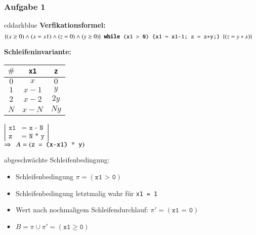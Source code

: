 \documentclass[aspectratio=1610,onlymath, ngerman, handout]{beamer}
\renewcommand{\emph}[1]{\textbf{#1}}
\newcommand*\head{\rowfont{\bfseries}}
\begin{document}
	\begin{frame} \frametitle{Aufgabe 1}
	\small
		\begin{doodle}{cddarkblue}
			\emph{Verfikationsformel:} \footnotesize
			\begin{equation*}
			\{ (x \ge 0) \land (x = x1) \land (z=0) \land (y \ge 0) \} \ \ \texttt{\emph{while} (x1 > 0) \{x1 = x1-1; z = z+y;\}} \ \ \{(z = y * x)\}
			\end{equation*}
		\end{doodle}
		
		\bigskip \pause
		
		\begin{minipage}{\dimexpr0.4\linewidth-\fboxrule-\fboxsep}
			\emph{Schleifeninvariante:} \pause
			\begin{center}
				\begin{tabu}{ccc}
					\toprule
					\head $\#$ & \texttt{x1} & \texttt{z} \\
					\midrule \midrule
					$0$	 & $x$   & $0$  \\
					$1$  & $x-1$ & $y$  \\
					$2$  & $x-2$ & $2y$ \\
					$N$  & $x-N$ & $Ny$ \\
					\bottomrule
				\end{tabu}
				
				\smallskip
				
				$\left| \begin{array}{rl}
				\texttt{x1} &\texttt{= x - N} \\ \texttt{z} &\texttt{= N * y}
				\end{array} \right|$ \\[6pt]
				$\Rightarrow \enskip A = (\texttt{z = (x-x1) * y})$
			\end{center}
		\end{minipage}
		\begin{minipage}{\dimexpr0.6\linewidth-\fboxrule-\fboxsep}
			abgeschwächte Schleifenbedingung:
			\begin{itemize}
				\item Schleifenbedingung $\pi = (\texttt{x1 > 0})$
				\item Schleifenbedingung letztmalig wahr für \texttt{x1 = 1}
				\item Wert nach nochmaligem Schleifendurchlauf: $\pi' = (\texttt{x1 = 0})$
				\item $B = \pi \cup \pi' = (\texttt{x1} \ge \texttt{0})$
			\end{itemize}
		\medskip
		
		
		\end{minipage}
	\end{frame}
\end{document}
